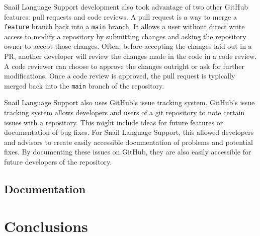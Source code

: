 \documentclass{article}
\begin{document}
Snail Language Support development also took advantage of two other GitHub features: pull requests and code reviews. A pull request is a way to merge a \lstinline{feature} branch back into a \lstinline{main} branch. It allows a user without direct write access to modify a repository by submitting changes and asking the repository owner to accept those changes. Often, before accepting the changes laid out in a PR, another developer will review the changes made in the code in a code review. A code reviewer can choose to approve the changes outright or ask for further modifications. Once a code review is approved, the pull request is typically merged back into the \lstinline{main} branch of the repository. 

Snail Language Support also uses GitHub's issue tracking system. GitHub's issue tracking system allows developers and users of a git repository to note certain issues with a repository. This might include ideas for future features or documentation of bug fixes. For Snail Language Support, this allowed developers and advisors to create easily accessible documentation of problems and potential fixes. By documenting these issues on GitHub, they are also easily accessible for future developers of the repository. 

\subsection{Documentation}

\section{Conclusions}

\newpage




\newpage
\end{document}
